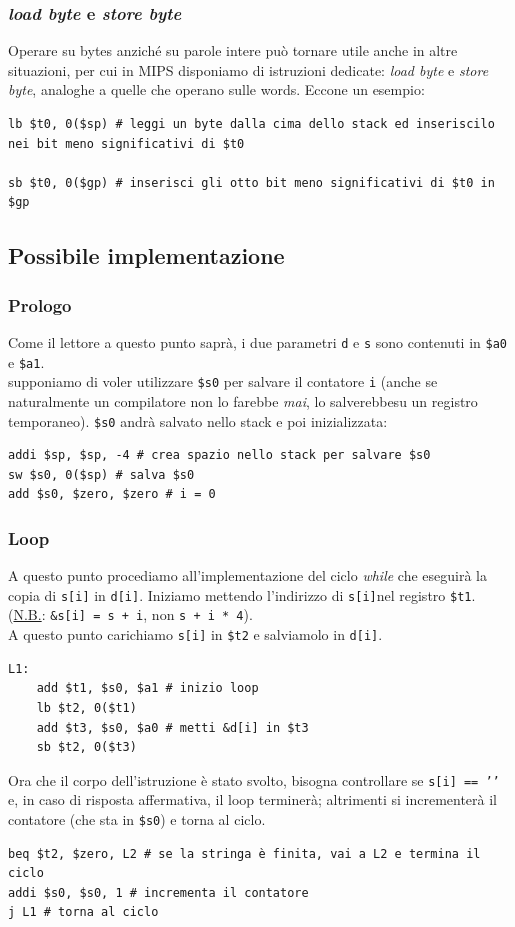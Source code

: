 \documentclass[class=book, crop=false]{standalone}
\begin{document}
\subsubsection{\emph{load byte} e \emph{store byte}}
Operare su bytes anziché su parole intere può tornare utile anche in altre situazioni, per cui in MIPS disponiamo di istruzioni dedicate: \emph{load byte} e \emph{store byte}, analoghe a quelle che operano sulle words. Eccone un esempio:
\begin{verbatim}
lb $t0, 0($sp) # leggi un byte dalla cima dello stack ed inseriscilo nei bit meno significativi di $t0

sb $t0, 0($gp) # inserisci gli otto bit meno significativi di $t0 in $gp
\end{verbatim}
\subsection{Possibile implementazione}
\subsubsection{Prologo}
Come il lettore a questo punto saprà, i due parametri \texttt{d} e  \texttt{s} sono contenuti in \texttt{\$a0} e \texttt{\$a1}.\\
supponiamo di voler utilizzare \texttt{\$s0} per salvare il contatore \texttt{i} (anche se naturalmente un compilatore non lo farebbe \emph{mai}, lo salverebbesu un registro temporaneo). \texttt{\$s0} andrà salvato nello stack e poi inizializzata:
\begin{verbatim}
addi $sp, $sp, -4 # crea spazio nello stack per salvare $s0
sw $s0, 0($sp) # salva $s0
add $s0, $zero, $zero # i = 0
\end{verbatim}

\subsubsection{Loop}
A questo punto procediamo all'implementazione del ciclo \emph{while} che eseguirà la copia di \texttt{s[i]} in \texttt{d[i]}. Iniziamo mettendo l'indirizzo di \texttt{s[i]}nel registro \texttt{\$t1}.\\
(\underline{N.B.}: \texttt{&s[i] = s + i}, non \texttt{s + i * 4}).\\
A questo punto carichiamo \texttt{s[i]}
in \texttt{\$t2} e salviamolo in \texttt{d[i]}.
\begin{verbatim}
L1:
	add $t1, $s0, $a1 # inizio loop
	lb $t2, 0($t1)
	add $t3, $s0, $a0 # metti &d[i] in $t3
	sb $t2, 0($t3)
\end{verbatim}
Ora che il corpo dell'istruzione è stato svolto, bisogna controllare se \texttt{s[i] == '\0'} e, in caso di risposta affermativa, il loop terminerà; altrimenti si incrementerà il contatore (che sta in \texttt{\$s0}) e torna al ciclo.
\begin{verbatim}
beq $t2, $zero, L2 # se la stringa è finita, vai a L2 e termina il ciclo
addi $s0, $s0, 1 # incrementa il contatore
j L1 # torna al ciclo
\end{verbatim}
\end{document}
